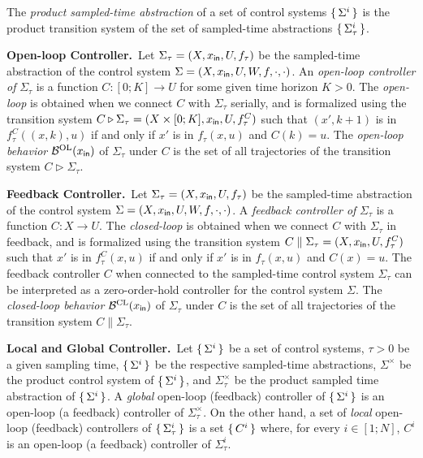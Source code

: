 The \emph{product sampled-time abstraction} of a set of control systems $\set{\Sigma^i} $ is the product transition system of the set of sampled-time abstractions $\set{\Sigma^i_\tau} $.

\smallskip
\noindent\textbf{Open-loop Controller.}\
Let $\Sigma_\tau=(X,x_{\mathsf{in}},U,f_\tau)$ be the sampled-time abstraction of the control system $\Sigma=(X,x_{\mathsf{in}},U,W,f,\cdot,\cdot)$.
An \emph{open-loop controller of} $\Sigma_\tau$ is a function $C\colon [0;K]\to U$ for some given time horizon $K>0$.
The \emph{open-loop} is obtained when we connect $C$ with $\Sigma_\tau$ serially, and is formalized using the transition system $C \triangleright \Sigma_\tau = (X\times [0;K],x_{\mathsf{in}},U,f_\tau^C)$ such that $(x',k+1)$ is in $f_\tau^C((x,k),u)$ if and only if $x'$ is in $f_\tau(x,u)$ and $C(k)=u$.
The \emph{open-loop behavior} $\mathcal{B}^{\mathrm{OL}}(x_{\mathsf{in}})$ of $\Sigma_\tau$ under $C$ is the set of all trajectories of the transition system $C \triangleright \Sigma_\tau$.

\smallskip
\noindent\textbf{Feedback Controller.}\
Let $\Sigma_\tau=(X,x_{\mathsf{in}},U,f_\tau)$ be the sampled-time abstraction of the control system $\Sigma=(X,x_{\mathsf{in}},U,W,f,\cdot,\cdot)$.
A \emph{feedback controller of} $\Sigma_\tau$ is a function $C\colon X\to U$.
The \emph{closed-loop} is obtained when we connect $C$ with $\Sigma_\tau$ in feedback, and is formalized using the transition system $C\parallel\Sigma_\tau = (X,x_{\mathsf{in}},U,f_\tau^C)$ such that $x'$ is in $f_\tau^C(x,u)$ if and only if $x'$ is in $f_\tau(x,u)$ and $C(x)=u$.
The feedback controller $C$ when connected to the sampled-time control system $\Sigma_\tau$ can be interpreted as a zero-order-hold controller for the control system $\Sigma$.
The \emph{closed-loop behavior} $\mathcal{B}^{\mathrm{CL}}(x_{\mathsf{in}})$ of $\Sigma_\tau$ under $C$ is the set of all trajectories of the transition system $C\parallel\Sigma_\tau$.

\smallskip
\noindent\textbf{Local and Global Controller.}\
Let $\set{\Sigma^i} $ be a set of control systems, $\tau >0$ be a given sampling time, $\set{\Sigma^i} $ be the respective sampled-time abstractions, $\Sigma^\times$ be the product control system of $\set{\Sigma^i} $, and $\Sigma^\times_\tau$ be the product sampled time abstraction of $\set{\Sigma^i} $.
A \emph{global} open-loop (feedback) controller of $\set{\Sigma^i} $ is an open-loop (a feedback) controller of $\Sigma_\tau^\times$.
On the other hand, a set of \emph{local} open-loop (feedback) controllers of $\set{\Sigma^i_\tau} $ is a set $\set{C^i} $ where, for every $i\in [1;N]$, $C^i$ is an open-loop (a feedback) controller of $\Sigma^i_\tau$.

